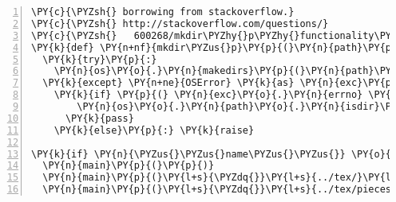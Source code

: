 \begin{Verbatim}[commandchars=\\\{\},numbers=left,numbersep=0.5em]
\PY{c}{\PYZsh{} borrowing from stackoverflow.}
\PY{c}{\PYZsh{} http://stackoverflow.com/questions/}
\PY{c}{\PYZsh{}   600268/mkdir\PYZhy{}p\PYZhy{}functionality\PYZhy{}in\PYZhy{}python}
\PY{k}{def} \PY{n+nf}{mkdir\PYZus{}p}\PY{p}{(}\PY{n}{path}\PY{p}{)}\PY{p}{:}
  \PY{k}{try}\PY{p}{:}
    \PY{n}{os}\PY{o}{.}\PY{n}{makedirs}\PY{p}{(}\PY{n}{path}\PY{p}{)}
  \PY{k}{except} \PY{n+ne}{OSError} \PY{k}{as} \PY{n}{exc}\PY{p}{:} \PY{c}{\PYZsh{} Python \PYZgt{}2.5}
    \PY{k}{if} \PY{p}{(} \PY{n}{exc}\PY{o}{.}\PY{n}{errno} \PY{o}{==} \PY{n}{errno}\PY{o}{.}\PY{n}{EEXIST} \PY{o+ow}{and} 
        \PY{n}{os}\PY{o}{.}\PY{n}{path}\PY{o}{.}\PY{n}{isdir}\PY{p}{(}\PY{n}{path}\PY{p}{)} \PY{p}{)}\PY{p}{:}
      \PY{k}{pass}
    \PY{k}{else}\PY{p}{:} \PY{k}{raise}
    
\PY{k}{if} \PY{n}{\PYZus{}\PYZus{}name\PYZus{}\PYZus{}} \PY{o}{==} \PY{l+s}{\PYZdq{}}\PY{l+s}{\PYZus{}\PYZus{}main\PYZus{}\PYZus{}}\PY{l+s}{\PYZdq{}}\PY{p}{:}
  \PY{n}{main}\PY{p}{(}\PY{p}{)}
  \PY{n}{main}\PY{p}{(}\PY{l+s}{\PYZdq{}}\PY{l+s}{../tex/}\PY{l+s}{\PYZdq{}}\PY{p}{,} \PY{n}{full}\PY{o}{=}\PY{n+nb+bp}{False}\PY{p}{,} \PY{n}{delete}\PY{o}{=}\PY{n+nb+bp}{False}\PY{p}{)}
  \PY{n}{main}\PY{p}{(}\PY{l+s}{\PYZdq{}}\PY{l+s}{../tex/pieces/}\PY{l+s}{\PYZdq{}}\PY{p}{,} \PY{n}{full}\PY{o}{=}\PY{n+nb+bp}{False}\PY{p}{,} \PY{n}{delete}\PY{o}{=}\PY{n+nb+bp}{False}\PY{p}{)}
\end{Verbatim}
